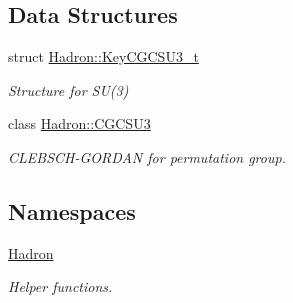 \subsection*{Data Structures}
\begin{DoxyCompactItemize}
\item 
struct \mbox{\hyperlink{structHadron_1_1KeyCGCSU3__t}{Hadron\+::\+Key\+C\+G\+C\+S\+U3\+\_\+t}}
\begin{DoxyCompactList}\small\item\em Structure for S\+U(3) \end{DoxyCompactList}\item 
class \mbox{\hyperlink{classHadron_1_1CGCSU3}{Hadron\+::\+C\+G\+C\+S\+U3}}
\begin{DoxyCompactList}\small\item\em C\+L\+E\+B\+S\+C\+H-\/\+G\+O\+R\+D\+AN for permutation group. \end{DoxyCompactList}\end{DoxyCompactItemize}
\subsection*{Namespaces}
\begin{DoxyCompactItemize}
\item 
 \mbox{\hyperlink{namespaceHadron}{Hadron}}
\begin{DoxyCompactList}\small\item\em Helper functions. \end{DoxyCompactList}\end{DoxyCompactItemize}
